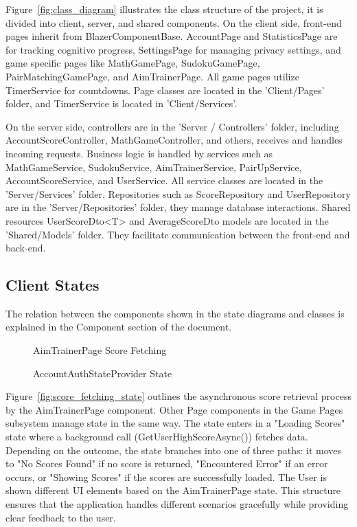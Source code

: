 \documentclass[11pt,a4paper]{article}
\newcommand{\inputdiagram}[1]{}
\newcommand{\textwidthdiagram}[2][1]{%
  \resizebox{#1\textwidth}{!}{\inputdiagram{#2}}%
}
\begin{document}
Figure~\ref{fig:class_diagram} illustrates the class structure of the project, it is divided into client, server, and shared components. On the client side, front-end pages inherit from BlazerComponentBase. AccountPage and StatisticsPage are for tracking cognitive progress, SettingsPage for managing privacy settings, and game specific pages like MathGamePage, SudokuGamePage, PairMatchingGamePage, and AimTrainerPage. All game pages utilize TimerService for countdowns. Page classes are located in the 'Client/Pages' folder, and TimerService is located in 'Client/Services'.

On the server side, controllers are in the 'Server / Controllers' folder, including AccountScoreController, MathGameController, and others, receives and handles incoming requests. Business logic is handled by services such as MathGameService, SudokuService, AimTrainerService, PairUpService, AccountScoreService, and UserService. All service classes are located in the ’Server/Services' folder. Repositories such as ScoreRepository and UserRepository are in the ’Server/Repositories’ folder, they manage database interactions.
Shared resources UserScoreDto<T> and AverageScoreDto models are located in the ’Shared/Models’ folder. They facilitate communication between the front-end and back-end.

\subsection{Client States}

The relation between the components shown in the state diagrams and classes is explained in the Component section of the document.

\begin{figure}[H]
    \centering
    \begin{minipage}[b]{0.59\textwidth}
        \centering
        \textwidthdiagram{score_fetching_state.tex}
        \caption{AimTrainerPage Score Fetching}
        \label{fig:score_fetching_state}
    \end{minipage}
    \hfil
    \begin{minipage}[b]{0.4\textwidth}
        \centering
        \textwidthdiagram{user_authentication_state.tex}
        \caption{AccountAuthStateProvider State}
        \label{fig:user_authentication_state}
    \end{minipage}
\end{figure}

Figure~\ref{fig:score_fetching_state} outlines the asynchronous score
retrieval process by the AimTrainerPage component. Other Page components in
the Game Pages subsystem manage state in the same way. The state enters in
a "Loading Scores" state where a background call (GetUserHighScoreAsync())
fetches data. Depending on the outcome, the state branches into one of three
paths: it moves to "No Scores Found" if no score is returned, "Encountered
Error" if an error occurs, or "Showing Scores" if the scores are successfully
loaded. The User is shown different UI elements based on the AimTrainerPage
state. This structure ensures that the application handles different scenarios
gracefully while providing clear feedback to the user.
\end{document}
